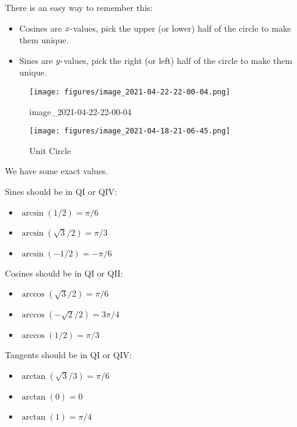 \begin{slogan}

There is an easy way to remember this:

\begin{itemize}
\tightlist
\item
  Cosines are \(x{\hbox{-}}\)values, pick the upper (or lower) half of
  the circle to make them unique.
\item
  Sines are \(y{\hbox{-}}\)values, pick the right (or left) half of the
  circle to make them unique.
\end{itemize}

\begin{figure}
\centering
\texttt{[image: figures/image\_2021-04-22-22-00-04.png]}
\caption{image\_2021-04-22-22-00-04}
\end{figure}

\end{slogan}

\begin{example}

\begin{figure}
\centering
\texttt{[image: figures/image\_2021-04-18-21-06-45.png]}
\caption{Unit Circle}
\end{figure}

We have some exact values.

Sines should be in QI or QIV:

\begin{itemize}
\tightlist
\item
  \(\arcsin(1/2) = \pi/6\)
\item
  \(\arcsin(\sqrt{3}/2) = \pi/3\)
\item
  \(\arcsin(-1/2) = -\pi/6\)
\end{itemize}

Cosines should be in QI or QII:

\begin{itemize}
\tightlist
\item
  \(\arccos(\sqrt{3}/2) = \pi/6\)
\item
  \(\arccos(-\sqrt{2}/2) = 3\pi/4\)
\item
  \(\arccos(1/2) = \pi/3\)
\end{itemize}

Tangents should be in QI or QIV:

\begin{itemize}
\tightlist
\item
  \(\arctan(\sqrt{3}/3) = \pi/6\)
\item
  \(\arctan(0) = 0\)
\item
  \(\arctan(1) = \pi/4\)
\end{itemize}

\end{example}


